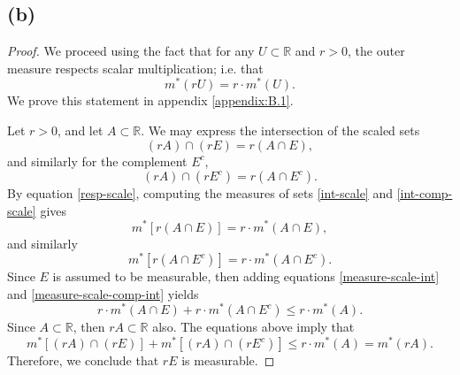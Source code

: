\documentclass{article}
\begin{document}
\subsection*{(b)}
\begin{proof}
	We proceed using the fact that for any $U \subset \mathbb{R}$ and $r > 0$, the outer measure respects scalar multiplication; i.e. that 
	\begin{equation}\label{resp-scale}
		m^*(rU) = r \cdot m^*(U).
	\end{equation}
	We prove this statement in appendix \ref{appendix:B.1}. 
	
	Let $r > 0$, and let $A \subset \mathbb{R}$. We may express the intersection of the scaled sets
	\begin{equation}\label{int-scale}
		(rA) \cap (rE) = r(A\cap E),
	\end{equation}
	and similarly for the complement $E^c$,
	\begin{equation}\label{int-comp-scale}
		(rA) \cap (rE^c) = r(A\cap E^c).
	\end{equation}
	By equation \eqref{resp-scale}, computing the measures of sets \eqref{int-scale} and \eqref{int-comp-scale} gives
	\begin{equation}\label{measure-scale-int}
		m^*\left[r(A\cap E)\right] = r \cdot m^*(A \cap E),
	\end{equation}
	and similarly
	\begin{equation}\label{measure-scale-comp-int}
		m^*\left[r(A\cap E^c)\right] = r \cdot m^*(A \cap E^c).
	\end{equation}
	Since $E$ is assumed to be measurable, then adding equations \eqref{measure-scale-int} and \eqref{measure-scale-comp-int} yields
	\begin{equation}
		r \cdot m^*(A\cap E) + r \cdot m^*(A \cap E^c) \leq r\cdot m^*(A).
	\end{equation}
	Since $A \subset \mathbb{R}$, then $rA \subset \mathbb{R}$ also. The equations above imply that
	\begin{equation}
		m^*\left[(rA)\cap(rE)\right] + m^*\left[(rA)\cap(rE^c)\right] \leq r\cdot m^*(A) = m^*(rA).
	\end{equation}
	Therefore, we conclude that $rE$ is measurable. 
\end{proof}
\end{document}

